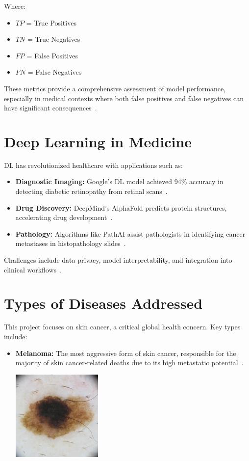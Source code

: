 \documentclass[a4paper,12pt]{report}
\begin{document}
\begin{spacing}{1.5}
    Where:
    \begin{itemize}
        \item $TP$ = True Positives
        \item $TN$ = True Negatives
        \item $FP$ = False Positives
        \item $FN$ = False Negatives
    \end{itemize}

    These metrics provide a comprehensive assessment of model performance, especially in medical contexts where both false positives and false negatives can have significant consequences~\cite{dl7}.
    \section{Deep Learning in Medicine}
    DL has revolutionized healthcare with applications such as:

    \begin{itemize}
        \item \textbf{Diagnostic Imaging:} Google’s DL model achieved 94\% accuracy in detecting diabetic retinopathy from retinal scans~\cite{dl8}.
        \item \textbf{Drug Discovery:} DeepMind’s AlphaFold predicts protein structures, accelerating drug development~\cite{dl9}.
        \item \textbf{Pathology:} Algorithms like PathAI assist pathologists in identifying cancer metastases in histopathology slides~\cite{dl10}.
    \end{itemize}
    Challenges include data privacy, model interpretability, and integration into clinical workflows~\cite{dl11}.
    
    \section{Types of Diseases Addressed}
    This project focuses on skin cancer, a critical global health concern. Key types include:
    
    \begin{itemize}
        \item \textbf{Melanoma:} The most aggressive form of skin cancer, responsible for the majority of skin cancer-related deaths due to its high metastatic potential~\cite{dl12,dl15}.
        
        \begin{center}
            \includegraphics[width=0.35\textwidth]{Pics/cancer/melanoma.jpg}
        \end{center}


\end{itemize}
\end{spacing}
\end{document}
